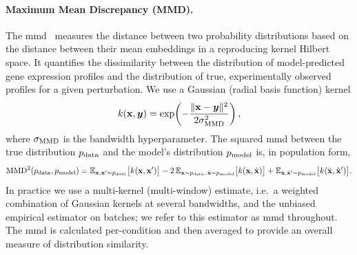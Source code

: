 \paragraph{Maximum Mean Discrepancy (MMD).}
The \gls{mmd}~\cite{gretton2012kernel} measures the distance between two probability distributions based on the distance between their mean embeddings in a reproducing kernel Hilbert space.
It quantifies the dissimilarity between the distribution of model-predicted gene expression profiles and the distribution of true, experimentally observed profiles for a given perturbation.
We use a Gaussian (radial basis function) kernel
\begin{equation}
    k({\mathbf{x}}, {\bm{y}}) = \exp\!\left( -\frac{\|{\mathbf{x}} - {\bm{y}}\|^2}{2\sigma_{\text{MMD}}^2} \right),
    \label{eq:metrics:kernel}
\end{equation}
where $\sigma_{\text{MMD}}$ is the bandwidth hyperparameter.
The squared \gls{mmd} between the true distribution $p_{\rm{data}}$ and the model's distribution $p_{\rm{model}}$ is, in population form,
\begin{equation}
    \operatorname{MMD}^2(p_{\rm{data}}, p_{\rm{model}}) = \mathbb{E}_{{\mathbf{x}}, {\mathbf{x}}' \sim p_{\rm{data}}}\bigl[k({\mathbf{x}}, {\mathbf{x}}')\bigr]
    - 2\,\mathbb{E}_{{\mathbf{x}} \sim p_{\rm{data}},\, \hat{{\mathbf{x}}} \sim p_{\rm{model}}}\bigl[k({\mathbf{x}}, \hat{{\mathbf{x}}})\bigr]
    + \mathbb{E}_{\hat{{\mathbf{x}}}, \hat{{\mathbf{x}}}' \sim p_{\rm{model}}}\bigl[k(\hat{{\mathbf{x}}}, \hat{{\mathbf{x}}}')\bigr] .
    \label{eq:metrics:mmd}
\end{equation}
In practice we use a multi-kernel (multi-window) estimate, i.e.\ a weighted combination of Gaussian kernels at several bandwidths, and the unbiased empirical estimator on batches; we refer to this estimator as \gls{mmd} throughout.
The \gls{mmd} is calculated per-condition and then averaged to provide an overall measure of distribution similarity.

